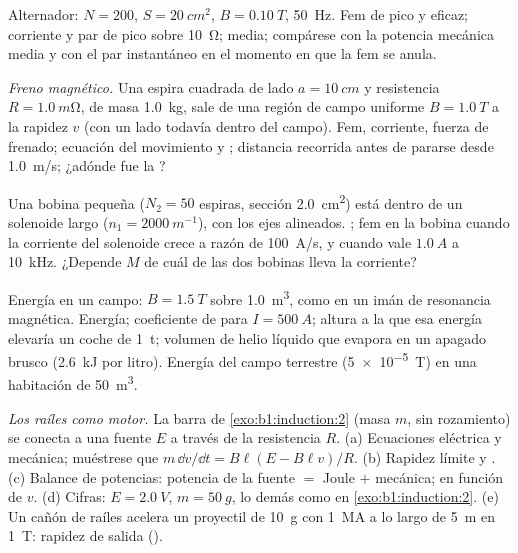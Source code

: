 \begin{exercise}[$\star\star$]\label{exo:b1:induction:6}
Alternador: $N = 200$, $S = \qty{20}{cm^2}$, $B = \qty{0.10}{T}$, \qty{50}{Hz}.
Fem de pico y eficaz; corriente y par de pico sobre \qty{10}{\ohm};
 media; compárese con la potencia mecánica media y con
el par instantáneo en el momento en que la fem se anula.
\end{exercise}

\begin{exercise}[$\star\star$]\label{exo:b1:induction:7}
\emph{Freno magnético.} Una espira cuadrada de lado $a = \qty{10}{cm}$ y
resistencia $R = \qty{1.0}{m\ohm}$, de masa \qty{1.0}{kg}, sale de una
región de campo uniforme $B = \qty{1.0}{T}$ a la rapidez $v$ (con un lado
todavía dentro del campo). Fem, corriente, fuerza de frenado; ecuación
del movimiento y ; distancia recorrida antes de
pararse desde \qty{1.0}{m/s}; ¿adónde fue la ?
\end{exercise}

\begin{exercise}[$\star\star$]\label{exo:b1:induction:8}
Una bobina pequeña ($N_2 = 50$ espiras, sección \qty{2.0}{cm^2}) está
dentro de un solenoide largo ($n_1 = \qty{2000}{m^{-1}}$), con los ejes
alineados. ; fem en la bobina cuando la corriente del
solenoide crece a razón de \qty{100}{A/s}, y cuando vale $\qty{1.0}{A}$ a
\qty{10}{kHz}. ¿Depende $M$ de cuál de las dos bobinas lleva la corriente?
\end{exercise}

\begin{exercise}[$\star\star$]\label{exo:b1:induction:9}
Energía en un campo: $B = \qty{1.5}{T}$ sobre \qty{1.0}{m^3}, como en un
imán de resonancia magnética. Energía; coeficiente de  para
$I = \qty{500}{A}$; altura a la que esa energía elevaría un coche de
\qty{1}{t}; volumen de helio líquido que evapora en un apagado brusco
(\qty{2.6}{kJ} por litro). Energía del campo terrestre
(\qty{5e-5}{T}) en una habitación de \qty{50}{m^3}.
\end{exercise}

\begin{exercise}[$\star\star\star$]\label{exo:b1:induction:10}
\emph{Los raíles como motor.} La barra de \cref{exo:b1:induction:2} (masa
$m$, sin rozamiento) se conecta a una fuente $E$ a través de la
resistencia $R$. (a) Ecuaciones eléctrica y mecánica; muéstrese que
$m\,\dd v/\dd t = B\ell(E -
B\ell v)/R$. (b) Rapidez límite y . (c) Balance de
potencias: potencia de la fuente $=$ Joule $+$ mecánica;  en
función de $v$. (d) Cifras: $E = \qty{2.0}{V}$, $m = \qty{50}{g}$, lo
demás como en \cref{exo:b1:induction:2}. (e) Un cañón de raíles acelera
un proyectil de \qty{10}{g} con \qty{1}{MA} a lo largo de \qty{5}{m} en
\qty{1}{T}: rapidez de salida ().
\end{exercise}

